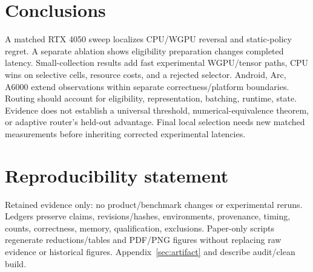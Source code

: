 \documentclass[10pt]{article}
\begin{document}
\section{Conclusions}
A matched RTX 4050 sweep localizes CPU/WGPU reversal and static-policy regret. A separate ablation shows eligibility preparation changes completed latency. Small-collection results add fast experimental WGPU/tensor paths, CPU wins on selective cells, resource costs, and a rejected selector. Android, Arc, A6000 extend observations within separate correctness/platform boundaries.
Routing should account for eligibility, representation, batching, runtime, state. Evidence does not establish a universal threshold, numerical-equivalence theorem, or adaptive router's held-out advantage. Final local selection needs new matched measurements before inheriting corrected experimental latencies.

\section*{Reproducibility statement}
Retained evidence only: no product/benchmark changes or experimental reruns. Ledgers preserve claims, revisions/hashes, environments, provenance, timing, counts, correctness, memory, qualification, exclusions. Paper-only scripts regenerate reductions/tables and PDF/PNG figures without replacing raw evidence or historical figures. Appendix~\ref{sec:artifact} and  describe audit/clean build.
\clearpage


\clearpage
\appendix

\end{document}
